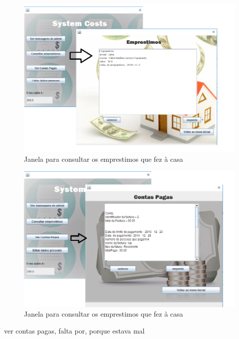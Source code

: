 \begin{figure}[h!]
	\centering
	\includegraphics[scale=0.6]{imagens/interface/consultaremprestimos}  
	\caption{Janela para consultar os emprestimos que fez à casa}  
\end{figure}

\begin{figure}[h!]
	\centering
	\includegraphics[scale=0.6]{imagens/interface/vercontaspagasmorador}  
	\caption{Janela para consultar os emprestimos que fez à casa}  
\end{figure}



ver contas pagas, falta por, porque estava mal 


